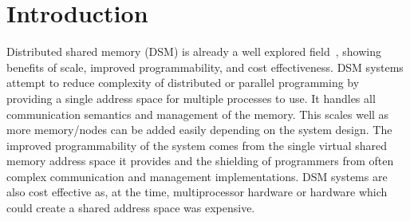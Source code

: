 \section{Introduction}
\label{sec:intro}

Distributed shared memory (DSM) is already a well explored field~\cite{gms, treadmarks, farm, grappa, Protic1996, Nitzberg1991}, showing benefits of scale, improved programmability, and cost effectiveness. DSM systems attempt to reduce complexity of distributed or parallel programming by providing a single address space for multiple processes to use. It handles all communication semantics and management of the memory. This scales well as more memory/nodes can be added easily depending on the system design. The improved programmability of the system comes from the single virtual shared memory address space it provides and the shielding of programmers from often complex communication and management implementations. DSM systems are also cost effective as, at the time, multiprocessor hardware or hardware which could create a shared address space was expensive. \cite{Protic1996}

